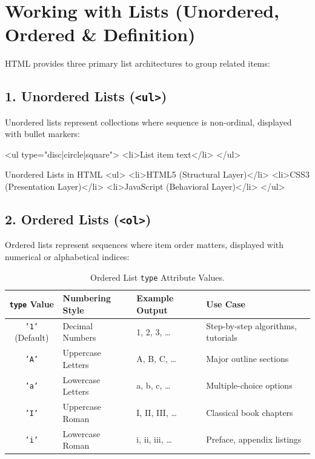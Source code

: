\section{Working with Lists (Unordered, Ordered \& Definition)}

HTML provides three primary list architectures to group related items:

\subsection{1. Unordered Lists (\texttt{<ul>})}
Unordered lists represent collections where sequence is non-ordinal, displayed with bullet markers:
\begin{syntaxbox}
<ul type="disc|circle|square">
    <li>List item text</li>
</ul>
\end{syntaxbox}

\begin{htmlcode}{Unordered Lists in HTML}
<ul>
    <li>HTML5 (Structural Layer)</li>
    <li>CSS3 (Presentation Layer)</li>
    <li>JavaScript (Behavioral Layer)</li>
</ul>
\end{htmlcode}

\subsection{2. Ordered Lists (\texttt{<ol>})}
Ordered lists represent sequences where item order matters, displayed with numerical or alphabetical indices:
\begin{table}[htbp]
\centering
\small
\renewcommand{\arraystretch}{1.3}
\begin{tabularx}{\linewidth}{cll>{\raggedright\arraybackslash}X}
\toprule
\textbf{\texttt{type} Value} & \textbf{Numbering Style} & \textbf{Example Output} & \textbf{Use Case} \\
\midrule
\texttt{'1'} (Default) & Decimal Numbers & 1, 2, 3, \dots & Step-by-step algorithms, tutorials \\
\texttt{'A'} & Uppercase Letters & A, B, C, \dots & Major outline sections \\
\texttt{'a'} & Lowercase Letters & a, b, c, \dots & Multiple-choice options \\
\texttt{'I'} & Uppercase Roman & I, II, III, \dots & Classical book chapters \\
\texttt{'i'} & Lowercase Roman & i, ii, iii, \dots & Preface, appendix listings \\
\bottomrule
\end{tabularx}
\caption{Ordered List \texttt{type} Attribute Values.}
\label{tab:ol-types}
\end{table}

